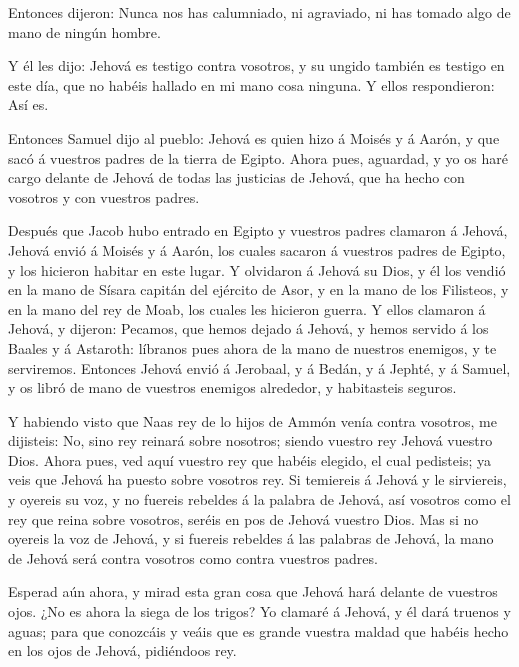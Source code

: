  Entonces dijeron: Nunca nos has calumniado, ni agraviado,
ni has tomado algo de mano de ningún hombre.

 Y él les dijo: Jehová es testigo contra vosotros, y su
ungido también es testigo en este día, que no habéis hallado en mi mano
cosa ninguna. Y ellos respondieron: Así es.

 Entonces Samuel dijo al pueblo: Jehová es quien hizo á
Moisés y á Aarón, y que sacó á vuestros padres de la tierra de Egipto.
 Ahora pues, aguardad, y yo os haré cargo delante de Jehová
de todas las justicias de Jehová, que ha hecho con vosotros y con
vuestros padres.

 Después que Jacob hubo entrado en Egipto y vuestros padres
clamaron á Jehová, Jehová envió á Moisés y á Aarón, los cuales sacaron á
vuestros padres de Egipto, y los hicieron habitar en este lugar.
 Y olvidaron á Jehová su Dios, y él los vendió en la mano de
Sísara capitán del ejército de Asor, y en la mano de los Filisteos, y en
la mano del rey de Moab, los cuales les hicieron guerra.  Y
ellos clamaron á Jehová, y dijeron: Pecamos, que hemos dejado á Jehová,
y hemos servido á los Baales y á Astaroth: líbranos pues ahora de la
mano de nuestros enemigos, y te serviremos.  Entonces
Jehová envió á Jerobaal, y á Bedán, y á Jephté, y á Samuel, y os libró
de mano de vuestros enemigos alrededor, y habitasteis seguros.

 Y habiendo visto que Naas rey de lo hijos de Ammón venía
contra vosotros, me dijisteis: No, sino rey reinará sobre nosotros;
siendo vuestro rey Jehová vuestro Dios.  Ahora pues, ved
aquí vuestro rey que habéis elegido, el cual pedisteis; ya veis que
Jehová ha puesto sobre vosotros rey.  Si temiereis á Jehová
y le sirviereis, y oyereis su voz, y no fuereis rebeldes á la palabra de
Jehová, así vosotros como el rey que reina sobre vosotros, seréis en pos
de Jehová vuestro Dios.  Mas si no oyereis la voz de
Jehová, y si fuereis rebeldes á las palabras de Jehová, la mano de
Jehová será contra vosotros como contra vuestros padres.

 Esperad aún ahora, y mirad esta gran cosa que Jehová hará
delante de vuestros ojos.  ¿No es ahora la siega de los
trigos? Yo clamaré á Jehová, y él dará truenos y aguas; para que
conozcáis y veáis que es grande vuestra maldad que habéis hecho en los
ojos de Jehová, pidiéndoos rey.

